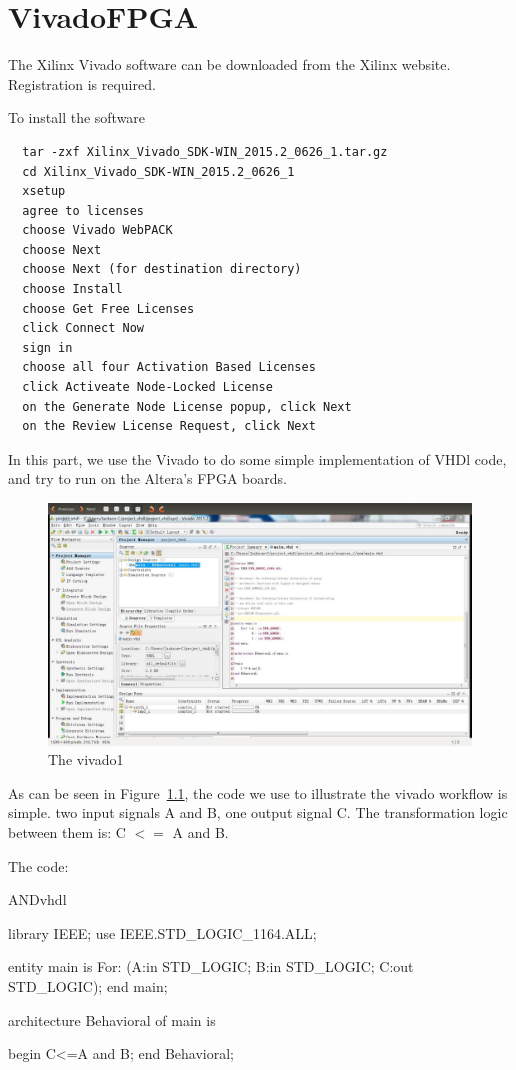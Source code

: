 \chapter{VivadoFPGA}

The Xilinx Vivado software can be downloaded from the Xilinx website\cite{54}.
Registration is required.

To install the software
\begin{verbatim}
  tar -zxf Xilinx_Vivado_SDK-WIN_2015.2_0626_1.tar.gz
  cd Xilinx_Vivado_SDK-WIN_2015.2_0626_1
  xsetup
  agree to licenses
  choose Vivado WebPACK
  choose Next
  choose Next (for destination directory)
  choose Install
  choose Get Free Licenses
  click Connect Now
  sign in
  choose all four Activation Based Licenses
  click Activeate Node-Locked License
  on the Generate Node License popup, click Next
  on the Review License Request, click Next
\end{verbatim}

In this part, we use the Vivado to do some simple implementation of
VHDl code, and try to run on the Altera's FPGA boards.

\begin{figure}[ht!]
\centering
\includegraphics[scale=0.25]{eps/vivado1.eps}
\caption{The vivado1}
\label{vivado1}
\end{figure}

As can be seen in Figure~\ref{vivado1}, the code we use to illustrate
the vivado workflow is simple. two input signals A and B, one output
signal C. The transformation logic between them is: C $<=$ A and B.

The code:

\begin{chunk}{ANDvhdl}

library IEEE;
use IEEE.STD_LOGIC_1164.ALL;

entity main is
	For: (A:in STD_LOGIC;
		B:in STD_LOGIC;
		C:out STD_LOGIC);
end main;

architecture Behavioral of main is

begin
	C<=A and B;
end Behavioral;

\end{chunk}


